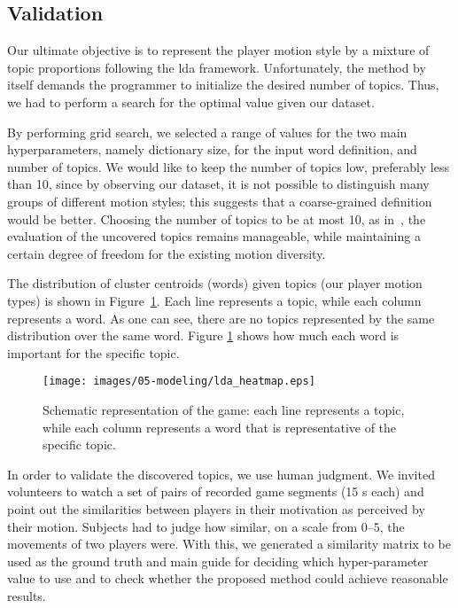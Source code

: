 \subsection{Validation}

Our ultimate objective is to represent the player motion style by a mixture of topic proportions following the \gls{lda} framework. Unfortunately, the method by itself demands the programmer to initialize the desired number of topics. Thus, we had to perform a search for the optimal value given our dataset.

By performing grid search, we selected a range of values for the two main hyperparameters, namely dictionary size, for the input word definition, and number of topics. We would like to keep the number of topics low, preferably less than 10, since by observing our dataset, it is not possible to distinguish many groups of different motion styles; this suggests that a coarse-grained definition would be better. Choosing the number of topics to be at most 10, as in~\cite{smith_mining_2016}, the evaluation of the uncovered topics remains manageable, while maintaining a certain degree of freedom for the existing motion diversity.

The distribution of cluster centroids (words) given topics (our player motion types) is shown in Figure~\ref{overallgame}.
Each line represents a topic, while each column represents a word. As one can see, there are no topics represented by the same distribution over the same word. Figure \ref{overallgame} shows how much each word is important for the specific topic.

\begin{figure}[H]
	\centering
	\texttt{[image: images/05-modeling/lda\_heatmap.eps]}
	\caption{Schematic representation of the game: each line represents a topic, while each column represents a word that is representative of the specific topic.}
  \label{overallgame}
\end{figure}

In order to validate the discovered topics, we use human judgment. We invited volunteers to watch a set of pairs of recorded game segments (15 s each) and point out the similarities between players in their motivation as perceived by their motion. Subjects had to judge how similar, on a scale from 0--5, the movements of two players were. With this, we generated a similarity matrix to be used as the ground truth and main guide for deciding which hyper-parameter value to use and to check whether the proposed method could achieve reasonable results.


